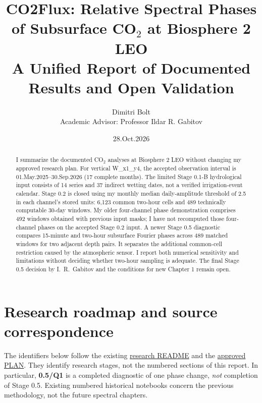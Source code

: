 \documentclass[11pt,letterpaper]{article}
\title{CO2Flux: Relative Spectral Phases of Subsurface CO$_2$ at Biosphere 2 LEO\\
\large A Unified Report of Documented Results and Open Validation}
\author{Dimitri Bolt\\{\small Academic Advisor: Professor Ildar R. Gabitov}}
\date{28.Oct.2026}
\begin{document}
\maketitle
\begin{abstract}
I summarize the documented CO$_2$ analyses at Biosphere 2 LEO
without changing my approved research plan. For vertical
W\_x1\_y4, the accepted observation interval is
01.May.2025--30.Sep.2026 (17 complete months).
The limited Stage 0.1-B hydrological input consists of
14 series and 37 indirect wetting dates, not a verified
irrigation-event calendar. Stage 0.2 is closed using my
monthly median daily-amplitude threshold of 2.5 in
each channel's stored units: 6,123 common two-hour cells
and 489 technically computable 30-day windows.
My older four-channel phase demonstration comprises
492 windows obtained with previous input masks; I have
not recomputed those four-channel phases on the accepted
Stage 0.2 input. A newer Stage 0.5 diagnostic compares
15-minute and two-hour subsurface Fourier phases across
489 matched windows for two adjacent depth pairs.
It separates the additional common-cell restriction
caused by the atmospheric sensor. I report both numerical
sensitivity and limitations without deciding whether
two-hour sampling is adequate. The final Stage 0.5
decision by I.~R.~Gabitov and the conditions for new
Chapter 1 remain open.
\end{abstract}
\tableofcontents

\clearpage
\section*{Research roadmap and source correspondence}
\label{sec:roadmap}
The identifiers below follow the existing
\href{https://github.com/DimitriBolt/CO2Flux/blob/main/Project_description/Research_log/README.md}{research README}
and the
\href{https://github.com/DimitriBolt/CO2Flux/blob/main/Project_description/Research_log/PLAN.md}{approved PLAN}.
They identify research stages, not the numbered sections of this report.
In particular, \textbf{0.5/Q1} is a completed diagnostic of one phase change,
\emph{not} completion of Stage 0.5. Existing numbered historical
notebooks concern the previous methodology, not the future spectral chapters.
\end{document}
